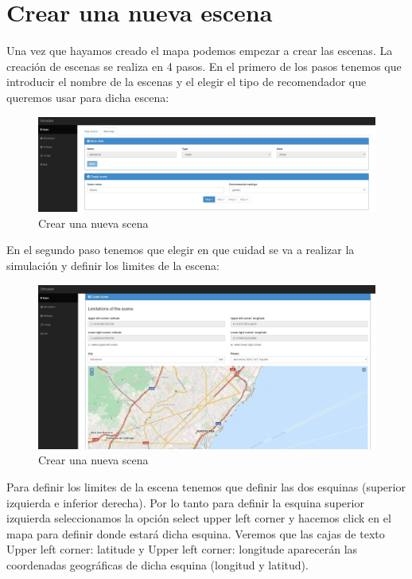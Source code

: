 \section{Crear una nueva escena}\label{sec:crearEscena}

Una vez que hayamos creado el mapa podemos empezar a crear las escenas. La creación de escenas se realiza en 4 pasos. En el primero de los pasos tenemos que introducir el nombre de la escenas y el elegir el tipo de recomendador que queremos usar para dicha escena:

\begin{figure}[H]
	\centering\includegraphics[scale=0.3]{imagenes/capitulo9/crear-escena-1.jpg}
	\caption{Crear una nueva scena}
	\label{img:AddScena1}
\end{figure}

En el segundo paso tenemos que elegir en que cuidad se va a realizar la simulación y definir los limites de la escena:

\begin{figure}[H]
	\centering\includegraphics[scale=0.3]{imagenes/capitulo9/crear-escena-2.jpg}
	\caption{Crear una nueva scena}
	\label{img:AddScena2}
\end{figure}

Para definir los limites de la escena tenemos que definir las dos esquinas (superior izquierda e inferior derecha). Por lo tanto para definir la esquina superior izquierda seleccionamos la opción select upper left corner y hacemos click en el mapa para definir donde estará dicha esquina. Veremos que las cajas de texto Upper left corner: latitude y Upper left corner: longitude aparecerán las coordenadas geográficas de dicha esquina (longitud y latitud).

